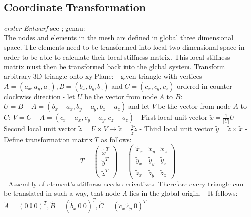  \subsection{Coordinate Transformation} %
 \textit{erster Entwurf}\newline
 see \cite{nguyen2008smoothed}; genau: \cite{zienkiewicz2000finite}\\
 The nodes and elements in the mesh are defined in global three dimensional space. The elements need to be transformed into local two dimensional space in order to be able to calculate their local stiffness matrix. This local stiffness matrix must then be transformed back into the global system.
 Transform arbitrary 3D triangle onto xy-Plane:
 - given triangle with vertices $A=(a_x, a_y, a_z), B=(b_x, b_y, b_z)$ and $C=(c_x, c_y, c_z)$ ordered in counter-clockwise direction\newline
 - let $U$ be the vector from node $A$ to $B$: $U = B-A = (b_x-a_x, b_y-a_y,b_z-a_z)$ and let $V$ be the vector from node $A$ to $C$: $V = C-A = (c_x-a_x,c_y-a_y,c_z-a_z)$\newline
 - First local unit vector $\tilde{x} = \frac{1}{\left|U\right|}U$\newline
 - Second local unit vector $\tilde{z} = U \times V \longrightarrow \tilde{z} = \frac{1}{\tilde{z}}\tilde{z}$\newline
 - Third local unit vector $\tilde{y} = \tilde{z} \times \tilde{x}$\newline
 - Define transformation matrix $T$ as follows: \[T = \begin{pmatrix}
 \tilde{x}^T\\ \tilde{y}^T\\ \tilde{z}^T
 \end{pmatrix}
 = \begin{pmatrix}
  \tilde{x}_x & \tilde{x}_y & \tilde{x}_z\\ \tilde{y}_x & \tilde{y}_y & \tilde{y}_z\\ \tilde{z}_x & \tilde{z}_y & \tilde{z}_z
  \end{pmatrix}\]
  - Assembly of element's stiffness needs derivatives. Therefore every triangle can be translated in such a way, that node $A$ lies in the global origin.\newline
  - It follows: $\tilde{A} = \left(0\ 0\ 0\right)^T, \tilde{B} = \left(\tilde{b}_x\ 0\ 0\right)^T, \tilde{C} = \left(\tilde{c}_x\ \tilde{c}_y\ 0\right)^T$\newline
